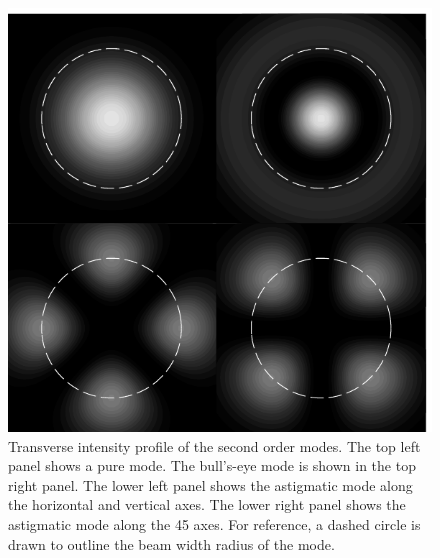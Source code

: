 \begin{figure}[h!]
  \begin{center}
  \leavevmode
  \includegraphics{figs-ap-notes/puresecondordermodes.pdf}
  \end{center}
  \caption[Transverse intensity profile of the second order modes.]{Transverse intensity profile of the second order modes. The top left panel shows a pure  mode. The bull's-eye mode is shown in the top right panel. The lower left panel shows the astigmatic mode along the horizontal and vertical axes. The lower right panel shows the astigmatic mode along the 45\degrees{} axes. For reference, a dashed circle is drawn to outline the beam width radius of the  mode.}
  \label{fig:puresecondordermodes}
\end{figure}

